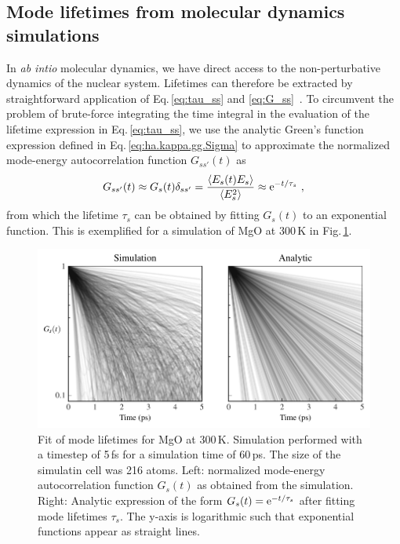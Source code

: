 \subsection{Mode lifetimes from molecular dynamics simulations}
In \emph{ab intio} molecular dynamics, we have direct access to the non-perturbative dynamics of the nuclear system. Lifetimes can therefore be extracted by straightforward application of Eq.\,\eqref{eq:tau_ss} and \eqref{eq:G_ss}~\cite{Ladd1986}. To circumvent the problem of brute-force integrating the time integral in the evaluation of the lifetime expression in Eq.\,\eqref{eq:tau_ss}, we use the analytic Green's function expression defined in Eq.\,\eqref{eq:ha.kappa.gg.Sigma} to approximate the normalized mode-energy autocorrelation function $G_{ss'} (t)$ as
%
\begin{align}
	G_{ss'} (t) \approx G_s (t) \delta_{ss'} = \frac{\braket{E_s (t) E_s}}{\braket{E^2_s}}
		\approx  {\rm e}^{-t / \tau_s}~,
	\label{eq:G_s}
\end{align}
%
from which the lifetime $\tau_s$ can be obtained by fitting $G_s (t)$ to an exponential function. This is exemplified for a simulation of MgO at 300\,K in Fig.\,\ref{fig:G_s}.
%
\begin{figure}
	\includegraphics[width=\textwidth]{./data/plots/lifetimes/greenkubo_summary_interpolation_lifetimes.pdf}
	\caption{Fit of mode lifetimes for MgO at 300\,K. Simulation performed with a timestep of 5\,fs for a simulation time of 60\,ps. The size of the simulatin cell was 216 atoms. Left: normalized mode-energy autocorrelation function $G_s (t)$ as obtained from the simulation. Right: Analytic expression of the form $G_s (t) = {\rm e}^{-t / \tau_s}$ after fitting mode lifetimes $\tau_s$. The y-axis is logarithmic such that exponential functions appear as straight lines.}
	\label{fig:G_s}
\end{figure}
%
%
%
%


